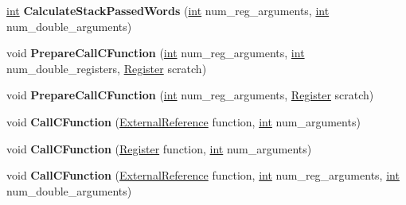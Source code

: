 \begin{DoxyCompactItemize}
\mbox{\label{classv8_1_1internal_1_1TurboAssembler_a7971fab06d53355f0def5455cf139f52}} 
\mbox{\hyperlink{classint}{int}} {\bfseries Calculate\+Stack\+Passed\+Words} (\mbox{\hyperlink{classint}{int}} num\+\_\+reg\+\_\+arguments, \mbox{\hyperlink{classint}{int}} num\+\_\+double\+\_\+arguments)
\item 
\mbox{\label{classv8_1_1internal_1_1TurboAssembler_ae111d12378cf9e12ef461e60a89f92e5}} 
void {\bfseries Prepare\+Call\+C\+Function} (\mbox{\hyperlink{classint}{int}} num\+\_\+reg\+\_\+arguments, \mbox{\hyperlink{classint}{int}} num\+\_\+double\+\_\+registers, \mbox{\hyperlink{classv8_1_1internal_1_1Register}{Register}} scratch)
\item 
\mbox{\label{classv8_1_1internal_1_1TurboAssembler_a55daccc2d27652f14c3a86b5109aa102}} 
void {\bfseries Prepare\+Call\+C\+Function} (\mbox{\hyperlink{classint}{int}} num\+\_\+reg\+\_\+arguments, \mbox{\hyperlink{classv8_1_1internal_1_1Register}{Register}} scratch)
\item 
\mbox{\label{classv8_1_1internal_1_1TurboAssembler_a46885d6523759af24eb058d5d8d39d44}} 
void {\bfseries Call\+C\+Function} (\mbox{\hyperlink{classv8_1_1internal_1_1ExternalReference}{External\+Reference}} function, \mbox{\hyperlink{classint}{int}} num\+\_\+arguments)
\item 
\mbox{\label{classv8_1_1internal_1_1TurboAssembler_a09dacf4e0be8170e3cbd4a489778633e}} 
void {\bfseries Call\+C\+Function} (\mbox{\hyperlink{classv8_1_1internal_1_1Register}{Register}} function, \mbox{\hyperlink{classint}{int}} num\+\_\+arguments)
\item 
\mbox{\label{classv8_1_1internal_1_1TurboAssembler_abdafca48f4971e28009f86e4ff25de15}} 
void {\bfseries Call\+C\+Function} (\mbox{\hyperlink{classv8_1_1internal_1_1ExternalReference}{External\+Reference}} function, \mbox{\hyperlink{classint}{int}} num\+\_\+reg\+\_\+arguments, \mbox{\hyperlink{classint}{int}} num\+\_\+double\+\_\+arguments)
\item 
\mbox{\label{classv8_1_1internal_1_1TurboAssembler_ac47afd32db8e770d2803e3f116c30e60}} 

\end{DoxyCompactItemize}
